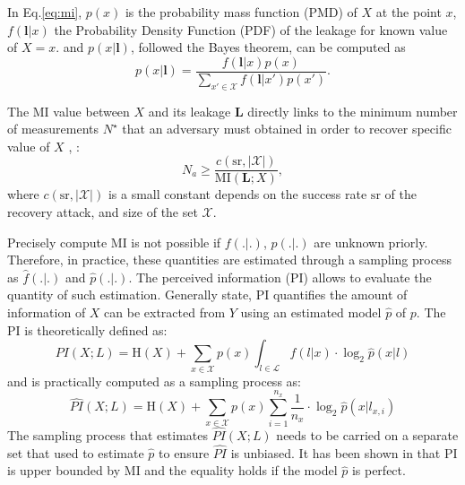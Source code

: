 \documentclass{llncs}
\begin{document}
In Eq.\ref{eq:mi},  $p(x)$ is the probability mass function (PMD) of $X$ at the point $x$,  $f(\bm{l}|x)$ the Probability Density Function (PDF) of the leakage for known value of $X=x$. and $p(x|\bm{l})$, followed the Bayes theorem, can be computed as
\begin{equation}\label{eq:f2p}
	p(x|\bm{l}) = \frac{f(\bm{l}|x)p(x)}{\sum_{x'\in \mathcal{X}}f(\bm{l}|x')p(x')}.
\end{equation}


The MI value between $X$ and its leakage $\mathbf{L}$ directly links to the minimum number of measurements $N^{\star}$ that an adversary must obtained in order to recover specific value of $X$ \cite{mivsna}, \cite{mivsna2}:
$$
N_a \geq \frac{c(\text{sr}, |\mathcal{X}|)}{\text{MI}(\mathbf{L}; X)},
$$
where $c(\text{sr}, |\mathcal{X}|)$ is a small constant depends on the success rate $\text{sr}$ of the recovery attack, and size of the set $\mathcal{X}$.

Precisely compute MI is not possible if $f(.|.)$, $p(.|.)$ are unknown priorly. Therefore, in practice, these quantities are estimated through a sampling process as $\hat{f}(.|.)$ and $\hat{p}(.|.)$. The perceived information (PI) allows to evaluate the quantity of such estimation. Generally state, PI quantifies the amount of information of $X$ can be extracted from $Y$ using an estimated model $\hat{p}$ of $p$. The PI is theoretically defined as:
\begin{equation*}
	PI(X; L) = \text{H}(X) + \sum_{x \in \mathcal{X}} p(x)\int_{l \in \mathcal{L}}f(l|x)\cdot \log_2 \hat{p}(x|l)
\end{equation*}
and is practically computed as a sampling process as:
\begin{equation}\label{eq:pi}
	\widehat{PI}(X; L) = \text{H}(X) + \sum_{x \in \mathcal{X}} p(x)\sum_{i=1}^{n_x}\frac{1}{n_x}\cdot \log_2 \hat{p}(x|l_{x, i})
\end{equation}
The sampling process that estimates $\widehat{PI}(X; L)$ needs to be carried on a separate set that used to estimate  $\hat{p}$ to ensure $\widehat{PI}$ is unbiased. It has been shown in \cite{lcert} that PI is upper bounded by MI and the equality holds if the model $\hat{p}$ is perfect.
\end{document}
